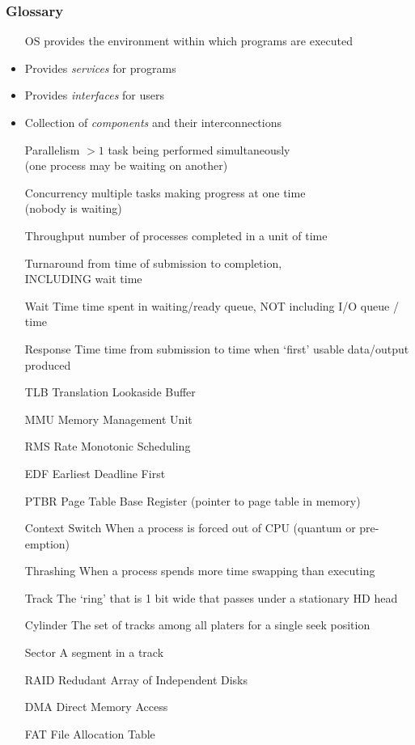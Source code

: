 \documentclass[a4paper]{article}
\newcommand{\resetsize}{\footnotesize}
\begin{document}
\begin{multicols*}{2}
    \resetsize
    \subsubsection*{Glossary}
    \setlength{\leftmargini}{6em}
    \begin{itemize}
        \item[OS] provides the environment within which programs are executed
        \item Provides \emph{services} for programs
        \item Provides \emph{interfaces} for users
        \item Collection of \emph{components} and their interconnections
        \item[Parallelism] \(> 1\) task being performed simultaneously \\
            (one process may be waiting on another)
        \item[Concurrency] multiple tasks making progress at one time \\
            (nobody is waiting)
        \item[Throughput] number of processes completed in a unit of time
        \item[Turnaround] from time of submission to completion, \\
            INCLUDING wait time
        \item[Wait Time] time spent in waiting/ready queue, NOT including I/O queue / time
        \item[Response Time] time from submission to time when `first' usable data/output produced
        \item[TLB] Translation Lookaside Buffer
        \item[MMU] Memory Management Unit
        \item[RMS] Rate Monotonic Scheduling
        \item[EDF] Earliest Deadline First
        \item[PTBR] Page Table Base Register (pointer to page table in memory)
        \item[Context Switch] When a process is forced out of CPU (quantum or pre-emption)
        \item[Thrashing] When a process spends more time swapping than executing
        \item[Track] The `ring' that is 1 bit wide that passes under a stationary HD head
        \item[Cylinder] The set of tracks among all platers for a single seek position
        \item[Sector] A segment in a track
        \item[RAID] Redudant Array of Independent Disks
        \item[DMA] Direct Memory Access
        \item[FAT] File Allocation Table
    \end{itemize}


\end{multicols*}
\end{document}
